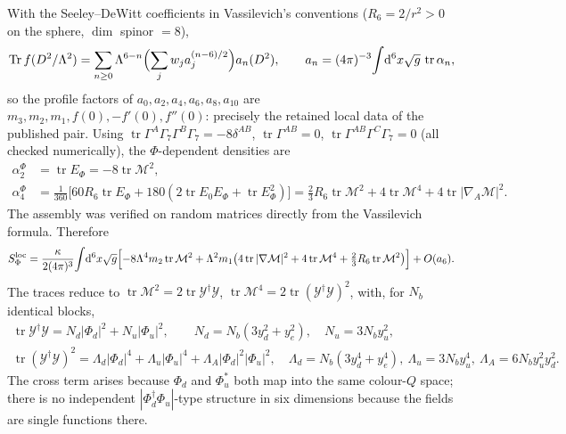 \documentclass[11pt,letterpaper]{article}
\DeclareMathOperator{\Tr}{Tr}
\DeclareMathOperator{\tr}{tr}
\newcommand{\dd}{\mathrm d}
\newcommand{\Mb}{\mathcal M}
\newcommand{\Yb}{\mathcal Y}
\newcommand{\Lam}{\Lambda}
\begin{document}
With the Seeley--DeWitt coefficients in Vassilevich's conventions \cite{Vass} ($R_6=2/r^2>0$ on the sphere, $\dim$ spinor $=8$),
\begin{equation}
\Tr f(D^2/\Lam^2)=\sum_{n\ge0}\Lam^{6-n}\Bigl(\sum_jw_ja_j^{(n-6)/2}\Bigr)a_n(D^2),\qquad a_n=(4\pi)^{-3}\!\int\!\dd^6x\sqrt g\,\tr\alpha_n ,
\end{equation}
so the profile factors of $a_0,a_2,a_4,a_6,a_8,a_{10}$ are $m_3,m_2,m_1,f(0),-f'(0),f''(0)$: precisely the retained local data of the published pair. Using $\tr\Gamma^A\Gamma_7\Gamma^B\Gamma_7=-8\delta^{AB}$, $\tr\Gamma^{AB}=0$, $\tr\Gamma^{AB}\Gamma^C\Gamma_7=0$ (all checked numerically), the $\Phi$-dependent densities are
\begin{align}
\alpha_2^\Phi&=\tr E_\Phi=-8\tr\Mb^2,\\
\alpha_4^\Phi&=\tfrac1{360}\bigl[60R_6\tr E_\Phi+180(2\tr E_0E_\Phi+\tr E_\Phi^2)\bigr]
=\tfrac23R_6\tr\Mb^2+4\tr\Mb^4+4\tr|\nabla_A\Mb|^2 .
\end{align}
The assembly was verified on random matrices directly from the Vassilevich formula. Therefore
\begin{equation}
S^{\rm loc}_\Phi=\frac{\kappa}{2(4\pi)^3}\!\int\!\dd^6x\sqrt g\Bigl[-8\Lam^4m_2\tr\Mb^2+\Lam^2m_1\bigl(4\tr|\nabla\Mb|^2+4\tr\Mb^4+\tfrac23R_6\tr\Mb^2\bigr)\Bigr]+O(a_6).
\label{eq:Sloc}
\end{equation}
The traces reduce to $\tr\Mb^2=2\tr\Yb^\dagger\Yb$, $\tr\Mb^4=2\tr(\Yb^\dagger\Yb)^2$, with, for $N_b$ identical blocks,
\begin{gather}
\tr\Yb^\dagger\Yb=N_d|\Phi_d|^2+N_u|\Phi_u|^2,\qquad N_d=N_b(3y_d^2+y_e^2),\quad N_u=3N_by_u^2,\\
\tr(\Yb^\dagger\Yb)^2=\Lam_d|\Phi_d|^4+\Lam_u|\Phi_u|^4+\Lam_A|\Phi_d|^2|\Phi_u|^2,\quad \Lam_d=N_b(3y_d^4+y_e^4),\ \Lam_u=3N_by_u^4,\ \Lam_A=6N_by_u^2y_d^2 .
\end{gather}
The cross term arises because $\Phi_d$ and $\Phi_u^{*}$ both map into the same colour-$Q$ space; there is no independent $|\Phi_d^\dagger\Phi_u|$-type structure in six dimensions because the fields are single functions there.
\end{document}
